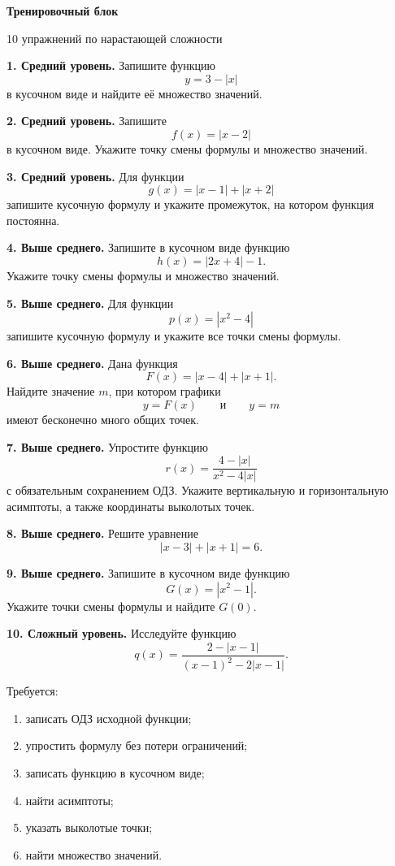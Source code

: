 \documentclass[a4paper,12pt]{article}
\begin{document}
\begin{center}
{\LARGE\bfseries\color{darkaccent}Тренировочный блок}

\vspace{0.3em}

{\color{muted}10 упражнений по нарастающей сложности}
\end{center}

\vspace{0.6em}

\textbf{1. Средний уровень.}
Запишите функцию
\[
y=3-|x|
\]
в кусочном виде и найдите её множество значений.

\textbf{2. Средний уровень.}
Запишите
\[
f(x)=|x-2|
\]
в кусочном виде. Укажите точку смены формулы и множество значений.

\textbf{3. Средний уровень.}
Для функции
\[
g(x)=|x-1|+|x+2|
\]
запишите кусочную формулу и укажите промежуток, на котором функция постоянна.

\vspace{0.5em}

\textbf{4. Выше среднего.}
Запишите в кусочном виде функцию
\[
h(x)=|2x+4|-1.
\]
Укажите точку смены формулы и множество значений.

\textbf{5. Выше среднего.}
Для функции
\[
p(x)=|x^2-4|
\]
запишите кусочную формулу и укажите все точки смены формулы.

\textbf{6. Выше среднего.}
Дана функция
\[
F(x)=|x-4|+|x+1|.
\]
Найдите значение \(m\), при котором графики
\[
y=F(x)
\qquad\text{и}\qquad
y=m
\]
имеют бесконечно много общих точек.

\textbf{7. Выше среднего.}
Упростите функцию
\[
r(x)=
\frac{4-|x|}
{x^2-4|x|}
\]
с обязательным сохранением ОДЗ. Укажите вертикальную и горизонтальную
асимптоты, а также координаты выколотых точек.

\textbf{8. Выше среднего.}
Решите уравнение
\[
|x-3|+|x+1|=6.
\]

\textbf{9. Выше среднего.}
Запишите в кусочном виде функцию
\[
G(x)=|x^2-1|.
\]
Укажите точки смены формулы и найдите \(G(0)\).

\vspace{0.5em}

\textbf{10. Сложный уровень.}
Исследуйте функцию
\[
q(x)=
\frac{2-|x-1|}
{(x-1)^2-2|x-1|}.
\]

Требуется:
\begin{enumerate}[label=\alph*)]
    \item записать ОДЗ исходной функции;
    \item упростить формулу без потери ограничений;
    \item записать функцию в кусочном виде;
    \item найти асимптоты;
    \item указать выколотые точки;
    \item найти множество значений.
\end{enumerate}
\end{document}
